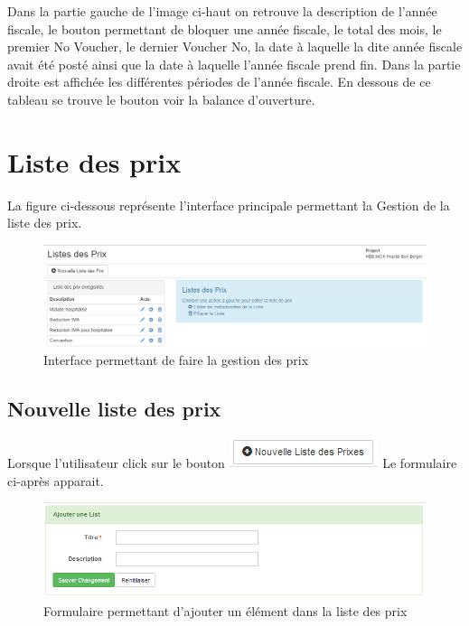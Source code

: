 \documentclass[12pt,a4paper]{report}
\begin{document}
Dans la partie gauche de l'image ci-haut on retrouve la description de l'année fiscale, le bouton permettant de bloquer une année fiscale, le total des mois, le premier No Voucher, le dernier Voucher No, la date à laquelle la dite année fiscale avait été posté ainsi que la date à laquelle l'année fiscale prend fin.
Dans la partie droite est affichée les différentes périodes de l'année fiscale. En dessous de ce tableau se trouve le bouton voir la balance d'ouverture.

\newpage
\section{Liste des prix}
La figure ci-dessous représente l'interface principale permettant la Gestion de la liste des prix. 
\begin{figure}[h]
\begin{center}
\includegraphics[width=12cm]{pic/ListePrix.png}
\end{center}
\caption{Interface permettant de faire la gestion des prix}
\label{Interface permettant de faire la gestion des prix}
\end{figure}

\subsection{Nouvelle liste des prix}
Lorsque l'utilisateur click sur le bouton \includegraphics[scale=0.7]{pic/NewListePrix.png} Le formulaire ci-après apparait.

\begin{figure}[h]
\begin{center}
\includegraphics[width=14cm]{pic/AjouterListePrix.png}
\end{center}
\caption{Formulaire permettant d'ajouter un élément dans la liste des prix}
\label{Formulaire permettant d'ajouter un élément dans la liste des prix}
\end{figure}
\end{document}
